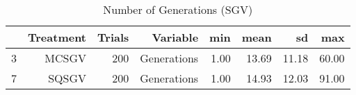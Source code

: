 \begin{table}[ht]
\centering
\begin{tabular}{rrrrrrrr}
  \hline
 & Treatment & Trials & Variable & min & mean & sd & max \\ 
  \hline
3 & MCSGV & 200 & Generations & 1.00 & 13.69 & 11.18 & 60.00 \\ 
  7 & SQSGV & 200 & Generations & 1.00 & 14.93 & 12.03 & 91.00 \\ 
   \hline
\end{tabular}
\caption{Number of Generations (SGV)} 
\end{table}
